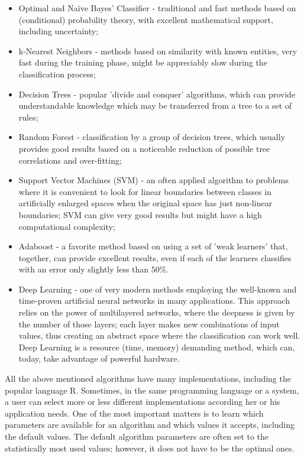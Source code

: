 \documentclass[10pt]{book}
\begin{document}
\begin{itemize}
  \item Optimal and Naïve Bayes' Classifier - traditional and fast methods based on (conditional) probability theory, with excellent mathematical support, including uncertainty;
  \item k-Nearest Neighbors - methods based on similarity with known entities, very fast during the training phase, might be appreciably slow during the classification process;
  \item Decision Trees - popular 'divide and conquer' algorithms, which can provide understandable knowledge which may be transferred from a tree to a set of rules;
  \item Random Forest - classification by a group of decision trees, which usually provides good results based on a noticeable reduction of possible tree correlations and over-fitting;
  \item Support Vector Machines (SVM) - an often applied algorithm to problems where it is convenient to look for linear boundaries between classes in artificially enlarged spaces when the original space has just non-linear boundaries; SVM can give very good results but might have a high computational complexity;
  \item Adaboost - a favorite method based on using a set of 'weak learners' that, together, can provide excellent results, even if each of the learners classifies with an error only slightly less than $50 \%$.
  \item Deep Learning - one of very modern methods employing the well-known and time-proven artificial neural networks in many applications. This approach relies on the power of multilayered networks, where the deepness is given by the number of those layers; each layer makes new combinations of input values, thus creating an abstract space where the classification can work well. Deep Learning is a resource (time, memory) demanding method, which can, today, take advantage of powerful hardware.
\end{itemize}

All the above mentioned algorithms have many implementations, including the popular language R. Sometimes, in the same programming language or a system, a user can select more or less different implementations according her or his application needs. One of the most important matters is to learn which parameters are available for an algorithm and which values it accepts, including the default values. The default algorithm parameters are often set to the statistically most used values; however, it does not have to be the optimal ones.
\end{document}
